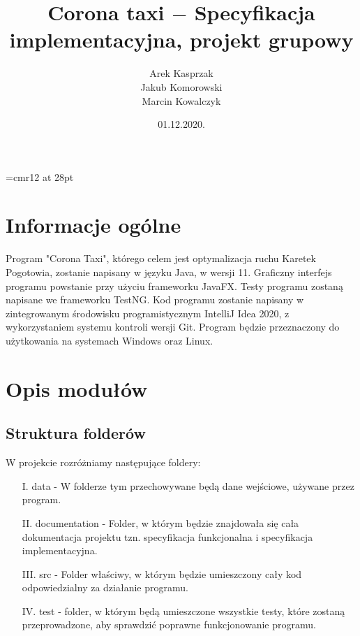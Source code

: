 \documentclass{article}
\begin{document}
\font\myfont=cmr12 at 28pt
\title{\myfont Corona taxi $-$ Specyfikacja implementacyjna, projekt grupowy}
\author{ \Huge Arek Kasprzak\\[8pt] \Huge Jakub Komorowski\\[8pt] \Huge Marcin Kowalczyk }
\date{\huge 01.12.2020.}
\maketitle

\thispagestyle{empty}
\newpage

\begin{frame}{}
    \tableofcontents
\end{frame}

\newpage

\section{Informacje ogólne}
    Program "Corona Taxi", którego celem jest optymalizacja ruchu Karetek Pogotowia, zostanie napisany w języku Java, w wersji 11. Graficzny interfejs programu powstanie przy użyciu frameworku JavaFX. Testy programu zostaną napisane we frameworku TestNG. Kod programu zostanie napisany w zintegrowanym środowisku programistycznym IntelliJ  Idea  2020, z wykorzystaniem systemu kontroli wersji Git. Program będzie przeznaczony do użytkowania na systemach Windows oraz Linux.

\section{Opis modułów}
    \subsection{Struktura folderów}
    W projekcie rozróżniamy następujące foldery:
    
     \begin{itemize}
            \item[I.] data - W folderze tym przechowywane będą dane wejściowe, używane przez program.
            \item[II.] documentation - Folder, w którym będzie znajdowała się cała dokumentacja projektu tzn. specyfikacja funkcjonalna i specyfikacja implementacyjna.
            \item[III.] src - Folder właściwy, w którym będzie umieszczony cały kod odpowiedzialny za działanie programu.
            \item[IV.] test - folder, w którym będą umieszczone wszystkie testy, które zostaną przeprowadzone, aby sprawdzić poprawne funkcjonowanie programu.
    \end{itemize}
\end{document}

